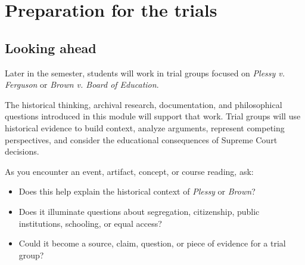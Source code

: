 \documentclass[
  letterpaper,
  DIV=11,
  numbers=noendperiod]{scrartcl}
\providecommand{\tightlist}{%
  \setlength{\itemsep}{0pt}\setlength{\parskip}{0pt}}\usepackage{longtable,booktabs,array}
\begin{document}
\section{Preparation for the trials}\label{preparation-for-the-trials}

\subsection{Looking ahead}\label{looking-ahead}

Later in the semester, students will work in trial groups focused on
\emph{Plessy v. Ferguson} or \emph{Brown v. Board of Education}.

The historical thinking, archival research, documentation, and
philosophical questions introduced in this module will support that
work. Trial groups will use historical evidence to build context,
analyze arguments, represent competing perspectives, and consider the
educational consequences of Supreme Court decisions.

\begin{tcolorbox}[enhanced jigsaw, colframe=quarto-callout-tip-color-frame, rightrule=.15mm, opacitybacktitle=0.6, leftrule=.75mm, colback=white, breakable, coltitle=black, arc=.35mm, bottomrule=.15mm, titlerule=0mm, left=2mm, colbacktitle=quarto-callout-tip-color!10!white, title=\textcolor{quarto-callout-tip-color}{\faLightbulb}\hspace{0.5em}{Start building connections}, toprule=.15mm, bottomtitle=1mm, toptitle=1mm, opacityback=0]

As you encounter an event, artifact, concept, or course reading, ask:

\begin{itemize}
\tightlist
\item
  Does this help explain the historical context of \emph{Plessy} or
  \emph{Brown}?
\item
  Does it illuminate questions about segregation, citizenship, public
  institutions, schooling, or equal access?
\item
  Could it become a source, claim, question, or piece of evidence for a
  trial group?
\end{itemize}

\end{tcolorbox}
\end{document}

